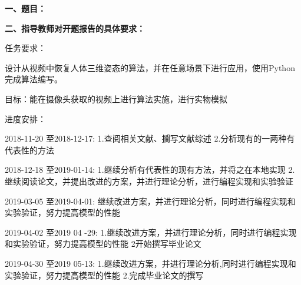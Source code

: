 {
    \setlength{\parindent}{0em}
    \par {\bfseries 一、题目：\uline{\hfill \Title \hfill}}
    \par {\bfseries 二、指导教师对开题报告的具体要求：}
}


任务要求：

设计从视频中恢复人体三维姿态的算法，并在任意场景下进行应用，使用Python完成算法编写。

目标：能在摄像头获取的视频上进行算法实施，进行实物模拟
 
进度安排：

2018-11-20 至2018-12-17: 1.查阅相关文献、攔写文献综述  2.分析现有的一两种有代表性的方法
      
2018-12-18 至2019-01-14: 1.继续分析有代表性的现有方法，并将之在本地实现  2.继续阅读论文，并提出改进的方案，并进行理论分析，进行编程实现和实验验证

2019-03-05 至2019-04-01: 继续改进方案，并进行理论分析，同时进行编程实现和实验验证，努力提高模型的性能

2019-04-02 至2019 04 -29: 1.继续改进方案，并进行理论分析，同时进行编程实现和实验验证，努力提高模型的性能  2开始撰写毕业论文

2019-04-30 至2019 05-13: 1.继续改进方案，并进行理论分析,同时进行编程实现和实验验证，努力提高模型的性能  2.完成毕业论文的撰写


\mbox{} \vfill

\signature{指导教师（签名）}
